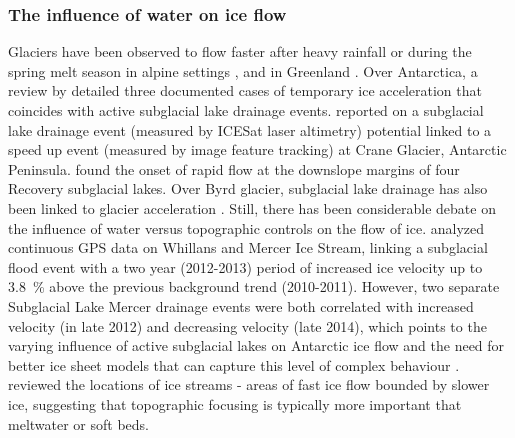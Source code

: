 \subsubsection{The influence of water on ice flow} \label{sec:influenceofwateroniceflow}

Glaciers have been observed to flow faster after heavy rainfall or during the spring melt season in alpine settings \citep[e.g.][]{IkenUpliftUnteraargletscherBeginning1983}, and in Greenland \citep{ZwallySurfaceMeltInducedAcceleration2002}.
Over Antarctica, a review by \citet{Frickerdecadeprogressobserving2016} detailed three documented cases of temporary ice acceleration that coincides with active subglacial lake drainage events.
\citet{Scambostriggeringsubglaciallake2011} reported on a subglacial lake drainage event (measured by ICESat laser altimetry) potential linked to a speed up event (measured by image feature tracking) at Crane Glacier, Antarctic Peninsula.
\citet{BellLargesubglaciallakes2007} found the onset of rapid flow at the downslope margins of four Recovery subglacial lakes.
Over Byrd glacier, subglacial lake drainage has also been linked to glacier acceleration \citep{StearnsIncreasedflowspeed2008,WrightSubglacialhydrologicalconnectivity2014}.
Still, there has been considerable debate on the influence of water versus topographic controls on the flow of ice.
\citet{SiegfriedEpisodicicevelocity2016} analyzed continuous GPS data on Whillans and Mercer Ice Stream, linking a subglacial flood event with a two year (2012-2013) period of increased ice velocity up to \SI{3.8}{\percent} above the previous background trend (2010-2011).
However, two separate Subglacial Lake Mercer drainage events were both correlated with increased velocity (in late 2012) and decreasing velocity (late 2014), which points to the varying influence of active subglacial lakes on Antarctic ice flow and the need for better ice sheet models that can capture this level of complex behaviour \citep{SiegfriedEpisodicicevelocity2016}.
\citet{WinsborrowWhatcontrolslocation2010} reviewed the locations of ice streams - areas of fast ice flow bounded by slower ice, suggesting that topographic focusing is typically more important that meltwater or soft beds.
